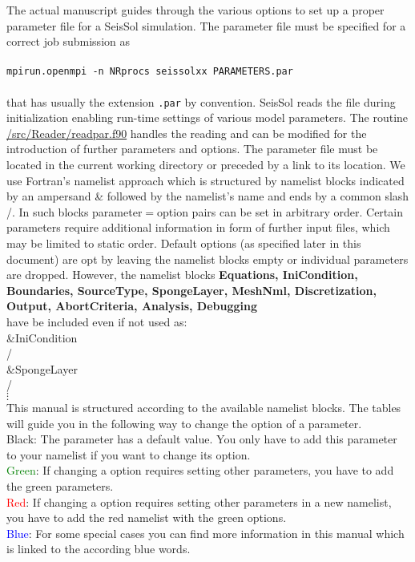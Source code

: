 \documentclass[12pt,twoside]{article}
\begin{document}
The actual manuscript guides through the various options to set up a proper parameter file for a SeisSol simulation.
The parameter file must be specified for a correct job submission as\\
\\
\texttt{mpirun.openmpi -n NRprocs seissolxx PARAMETERS.par}\\
\\
that has usually the extension {\tt*.par} by convention. 
SeisSol reads the file during initialization enabling run-time settings of various model parameters.
The routine \url{/src/Reader/readpar.f90} handles the reading 
and can be modified for the introduction of further parameters and options.
The parameter file must be located in the current working directory or preceded by a link to its location.
We use Fortran's namelist approach which is structured by namelist blocks indicated by an ampersand \&  
followed by the namelist's name and ends by a common slash /. 
In such blocks parameter$=$option pairs can be set in arbitrary order.
Certain parameters require additional information in form of further input files, 
which may be limited to static order.
Default options (as specified later in this document) are opt by leaving the namelist blocks empty or individual parameters are dropped.
However, the namelist blocks 
\textbf{Equations, IniCondition, Boundaries, SourceType, SpongeLayer, MeshNml, Discretization, Output, AbortCriteria, Analysis, Debugging}\\
have be included even if not used as:\\

\noindent \&IniCondition\\
/\\

\noindent \&SpongeLayer\\
/\\


\hspace{5mm}$\vdots$  \\


\noindent
This manual is structured according to the available namelist blocks.
The tables will guide you in the following way to change the option of a parameter.\\
Black: The parameter has a default value. You only have to add this parameter to your namelist if you want to change its option.\\
\textcolor{green}{Green}: If changing a option requires setting other parameters, you have to add the green parameters.\\
\textcolor{red}{Red}:  If changing a option requires setting other parameters in a new namelist, 
you have to add the red namelist with the green options.\\
\textcolor{blue}{Blue}: For some special cases you can find more information in this manual which is linked to the according blue words.
\end{document}
